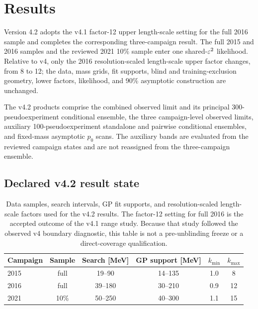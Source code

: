\providecommand{\VFourPTwoLocalPZeroMinimum}{\ensuremath{3.25918\times10^{-5}}}
\providecommand{\VFourPTwoLocalPZeroMass}{\SI{65}{MeV}}
\providecommand{\VFourPTwoLocalZ}{\ensuremath{3.99321}}
\providecommand{\VFourPTwoEffectiveTrials}{\ensuremath{35.3814}}
\providecommand{\VFourPTwoSidakValue}{\ensuremath{0.00115250}}
\providecommand{\VFourPTwoSidakZ}{\ensuremath{3.04783}}
\providecommand{\VFourPTwoEpsHat}{\ensuremath{6.42706\times10^{-6}}}
\providecommand{\VFourPTwoEpsHatSigma}{\ensuremath{1.61009\times10^{-6}}}

\section{Results}
\label{sec:results}

Version 4.2 adopts the v4.1 factor-12 upper length-scale setting for the full
2016 sample and completes the corresponding three-campaign result. The full 2015
and 2016 samples and the reviewed 2021 10\% sample enter one shared-$\varepsilon^2$
likelihood. Relative to v4, only the 2016 resolution-scaled length-scale upper
factor changes, from 8 to 12; the data, mass grids, fit supports, blind and
training-exclusion geometry, lower factors, likelihood, and 90\% asymptotic
\CLs{} construction are unchanged.

The v4.2 products comprise the combined observed limit and its principal
300-pseudoexperiment conditional ensemble, the three campaign-level observed
limits, auxiliary 100-pseudoexperiment standalone and pairwise conditional
ensembles, and fixed-mass asymptotic $p_0$ scans. The auxiliary bands are
evaluated from the reviewed campaign states and are not reassigned from the
three-campaign ensemble.

\subsection{Declared v4.2 result state}
\label{sec:results-v4p2-analysis-state}

\begin{table}[H]
\centering
\small
{\setlength{\tabcolsep}{5pt}
\begin{tabular}{lccccc}
\toprule
Campaign & Sample & Search [MeV] & GP support [MeV] &
$k_{\min}$ & $k_{\max}$ \\
\midrule
2015 & full & 19--90  & 14--135 & 1.0 & 8 \\
2016 & full & 39--180 & 30--210 & 0.9 & 12 \\
2021 & 10\% & 50--250 & 40--300 & 1.1 & 15 \\
\bottomrule
\end{tabular}
}
\caption{Data samples, search intervals, GP fit supports, and
resolution-scaled length-scale factors used for the v4.2 results. The factor-12
setting for full 2016 is the accepted outcome of the v4.1 range study. Because
that study followed the observed v4 boundary diagnostic, this table is not a
pre-unblinding freeze or a direct-coverage qualification.}
\label{tab:results-v4p2-configuration}
\end{table}

